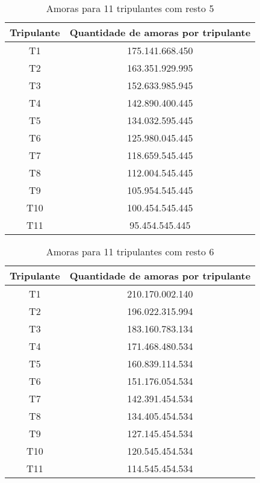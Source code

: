 \documentclass[12pt]{article}
\begin{document}
\begin{table}[H]

\centering

\begin{tabular}{|c|c|}

\hline
Tripulante & Quantidade de amoras por tripulante \\
\hline
T1 & 175.141.668.450 \\
\hline
T2 & 163.351.929.995 \\
\hline
T3 & 152.633.985.945 \\
\hline
T4 & 142.890.400.445 \\
\hline
T5 & 134.032.595.445 \\
\hline
T6 & 125.980.045.445 \\
\hline
T7 & 118.659.545.445 \\
\hline
T8 & 112.004.545.445 \\
\hline
T9 & 105.954.545.445 \\
\hline
T10 & 100.454.545.445 \\
\hline
T11 & 95.454.545.445 \\
\hline

\end{tabular}
\label{Tabela27}
\caption{Amoras para 11 tripulantes com resto 5}

\end{table}

\begin{table}[H]

\centering

\begin{tabular}{|c|c|}

\hline
Tripulante & Quantidade de amoras por tripulante \\
\hline
T1 & 210.170.002.140 \\
\hline
T2 & 196.022.315.994 \\
\hline
T3 & 183.160.783.134 \\
\hline
T4 & 171.468.480.534 \\
\hline
T5 & 160.839.114.534 \\
\hline
T6 & 151.176.054.534 \\
\hline
T7 & 142.391.454.534 \\
\hline
T8 & 134.405.454.534 \\
\hline
T9 & 127.145.454.534 \\
\hline
T10 & 120.545.454.534 \\
\hline
T11 & 114.545.454.534 \\
\hline

\end{tabular}
\label{Tabela28}
\caption{Amoras para 11 tripulantes com resto 6}

\end{table}
\end{document}
